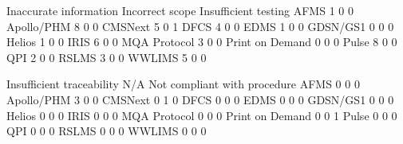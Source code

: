 \documentclass{article}
\begin{document}
\begin{Schunk}
\begin{Soutput}
                  Inaccurate information Incorrect scope Insufficient testing
  AFMS                                 1               0                    0
  Apollo/PHM                           8               0                    0
  CMSNext                              5               0                    1
  DFCS                                 4               0                    0
  EDMS                                 1               0                    0
  GDSN/GS1                             0               0                    0
  Helios                               1               0                    0
  IRIS                                 6               0                    0
  MQA Protocol                         3               0                    0
  Print on Demand                      0               0                    0
  Pulse                                8               0                    0
  QPI                                  2               0                    0
  RSLMS                                3               0                    0
  WWLIMS                               5               0                    0
                 
                  Insufficient traceability N/A Not compliant with procedure
  AFMS                                    0   0                            0
  Apollo/PHM                              3   0                            0
  CMSNext                                 0   1                            0
  DFCS                                    0   0                            0
  EDMS                                    0   0                            0
  GDSN/GS1                                0   0                            0
  Helios                                  0   0                            0
  IRIS                                    0   0                            0
  MQA Protocol                            0   0                            0
  Print on Demand                         0   0                            1
  Pulse                                   0   0                            0
  QPI                                     0   0                            0
  RSLMS                                   0   0                            0
  WWLIMS                                  0   0                            0
                 

\end{Soutput}
\end{Schunk}
\end{document}
